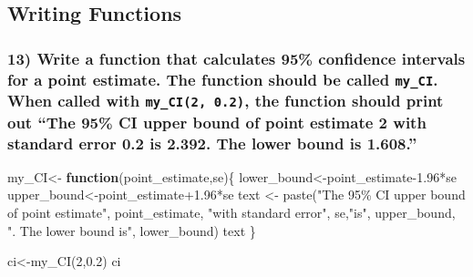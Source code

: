 \documentclass[
  12pt,
]{article}
\newenvironment{Shaded}{\begin{snugshade}}{\end{snugshade}}
\newcommand{\ControlFlowTok}[1]{\textcolor[rgb]{0.13,0.29,0.53}{\textbf{#1}}}
\newcommand{\DecValTok}[1]{\textcolor[rgb]{0.00,0.00,0.81}{#1}}
\newcommand{\FloatTok}[1]{\textcolor[rgb]{0.00,0.00,0.81}{#1}}
\newcommand{\FunctionTok}[1]{\textcolor[rgb]{0.00,0.00,0.00}{#1}}
\newcommand{\NormalTok}[1]{#1}
\newcommand{\OtherTok}[1]{\textcolor[rgb]{0.56,0.35,0.01}{#1}}
\newcommand{\SpecialCharTok}[1]{\textcolor[rgb]{0.00,0.00,0.00}{#1}}
\newcommand{\StringTok}[1]{\textcolor[rgb]{0.31,0.60,0.02}{#1}}
\begin{document}
\hypertarget{writing-functions}{%
\subsection{Writing Functions}\label{writing-functions}}

\hypertarget{write-a-function-that-calculates-95-confidence-intervals-for-a-point-estimate.-the-function-should-be-called-my_ci.-when-called-with-my_ci2-0.2-the-function-should-print-out-the-95-ci-upper-bound-of-point-estimate-2-with-standard-error-0.2-is-2.392.-the-lower-bound-is-1.608.}{%
\subsubsection{\texorpdfstring{13) Write a function that calculates 95\%
confidence intervals for a point estimate. The function should be called
\texttt{my\_CI}. When called with \texttt{my\_CI(2,\ 0.2)}, the function
should print out ``The 95\% CI upper bound of point estimate 2 with
standard error 0.2 is 2.392. The lower bound is
1.608.''}{13) Write a function that calculates 95\% confidence intervals for a point estimate. The function should be called my\_CI. When called with my\_CI(2, 0.2), the function should print out ``The 95\% CI upper bound of point estimate 2 with standard error 0.2 is 2.392. The lower bound is 1.608.''}}\label{write-a-function-that-calculates-95-confidence-intervals-for-a-point-estimate.-the-function-should-be-called-my_ci.-when-called-with-my_ci2-0.2-the-function-should-print-out-the-95-ci-upper-bound-of-point-estimate-2-with-standard-error-0.2-is-2.392.-the-lower-bound-is-1.608.}}

\begin{Shaded}
\begin{Highlighting}[]
\NormalTok{my\_CI}\OtherTok{\textless{}{-}} \ControlFlowTok{function}\NormalTok{(point\_estimate,se)\{}
\NormalTok{  lower\_bound}\OtherTok{\textless{}{-}}\NormalTok{point\_estimate}\FloatTok{{-}1.96}\SpecialCharTok{*}\NormalTok{se}
\NormalTok{  upper\_bound}\OtherTok{\textless{}{-}}\NormalTok{point\_estimate}\FloatTok{+1.96}\SpecialCharTok{*}\NormalTok{se}
\NormalTok{  text }\OtherTok{\textless{}{-}} \FunctionTok{paste}\NormalTok{(}\StringTok{"The 95\% CI upper bound of point estimate"}\NormalTok{, point\_estimate, }\StringTok{"with standard error"}\NormalTok{, se,}\StringTok{"is"}\NormalTok{, upper\_bound, }\StringTok{". The lower bound is"}\NormalTok{, lower\_bound)}
\NormalTok{  text}
\NormalTok{\}}

\NormalTok{ci}\OtherTok{\textless{}{-}}\FunctionTok{my\_CI}\NormalTok{(}\DecValTok{2}\NormalTok{,}\FloatTok{0.2}\NormalTok{)}
\NormalTok{ci}
\end{Highlighting}
\end{Shaded}
\end{document}
